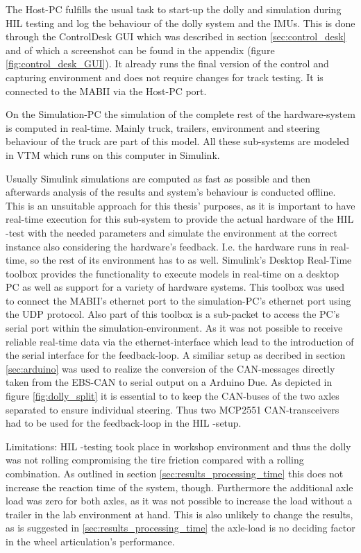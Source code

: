 \documentclass[ExampleMasters.tex]{subfiles}
\begin{document}
The Host-PC fulfills the usual task to start-up the dolly and simulation during \gls{HIL}  testing and log the behaviour of the dolly system and the \gls{IMU}s. This is done through the ControlDesk \gls{GUI} which was described in section \ref{sec:control_desk} and of which a screenshot can be found in the appendix (figure \ref{fig:control_desk_GUI}). It already runs the final version of the control and capturing environment and does not require changes for track testing. It is connected to the \gls{MABII} via the Host-PC port.

On the Simulation-PC the simulation of the complete rest of the hardware-system is computed in real-time. Mainly truck, trailers, environment and steering behaviour of the truck are part of this model. All these sub-systems are modeled in \gls{VTM}  which runs on this computer in Simulink. 

Usually Simulink simulations are computed as fast as possible and then afterwards analysis of the results and system's behaviour is conducted offline. This is an unsuitable approach for this thesis' purposes, as it is important to have real-time execution for this sub-system to provide the actual hardware of the \gls{HIL} -test with the needed parameters and simulate the environment at the correct instance also considering the hardware's feedback. I.e. the hardware runs in real-time, so the rest of its environment has to as well. Simulink's Desktop Real-Time toolbox provides the functionality to execute models in real-time on a desktop PC as well as support for a variety of hardware systems. This toolbox was used to connect the MABII's ethernet port to the simulation-PC's ethernet port using the \gls{UDP} protocol. Also part of this toolbox is a sub-packet to access the PC's serial port within the simulation-environment. As it was not possible to receive reliable real-time data via the ethernet-interface which lead to the introduction of the serial interface for the feedback-loop. A similiar setup as decribed in section \ref{sec:arduino} was used to realize the conversion of the CAN-messages directly taken from the \gls{EBS}-\gls{CAN} to serial output on a Arduino Due. As depicted in figure \ref{fig:dolly_split} it is essential to to keep the CAN-buses of the two axles separated to ensure individual steering. Thus two MCP2551 \gls{CAN}-transceivers had to be used for the feedback-loop in the \gls{HIL} -setup.

Limitations: \gls{HIL} -testing took place in workshop environment and thus the dolly was not rolling compromising the tire friction compared with a rolling combination. As outlined in section \ref{sec:results_processing_time} this does not increase the reaction time of the system, though. Furthermore the additional axle load was zero for both axles, as it was not possible to increase the load without a trailer in the lab environment at hand. This is also unlikely to change the results, as is suggested in \ref{sec:results_processing_time} the axle-load is no deciding factor in the wheel articulation's performance. 
\end{document}
